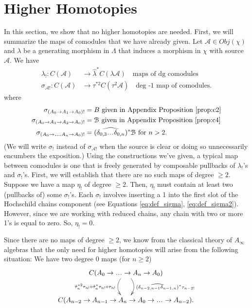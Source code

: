 \section{Higher Homotopies}
In this section, we show 
that no higher homotopies are needed. 
First, we will summarize the 
maps of comodules that we have 
already given. Let 
$\mathcal{A} \in Obj(\chi)$ and 
$\lambda$ be a generating morphism in $\Lambda$ 
that induces a morphism in $\chi$ with 
source $\mathcal{A}$. We have 
\begin{align*}
\lambda_!: C(\mathcal{A})
&\to 
\hat{\lambda}^*C(\lambda\mathcal{A})
  \quad \textrm{maps of dg comodules}\\
\sigma_{\mathcal{A}!}:
  C(\mathcal{A}) 
&\to 
\tau^{*2}C(\tau^2\mathcal{A})
  \quad \textrm{deg -1 map of comodules.}
\end{align*}
where
\begin{align*}
\sigma_{(A_0 \to A_1 \to A_0)!}
&= 
B \textrm{ given in Appendix 
  Proposition \ref{prop:c2}}\\
\sigma_{(A_0 \to A_1 \to A_2 \to A_0)!}
&= 
\mathcal{B} \textrm{ given in Appendix 
  Proposition \ref{prop:c4}}\\
\sigma_{(A_0 \to \smdots A_n \to A_0)!}
&= 
(\widehat{\delta_{0,3}\smdots\delta_{0,n}})^*
  \mathcal{B} \textrm{ for } n>2.\\  
\end{align*}
(We will write $\sigma_!$ instead of 
$\sigma_{\mathcal{A}!}$ when the source 
is clear or doing so unnecessarily 
encumbers the exposition.) 
Using the constructions we've given, 
a typical map between comodules is 
one that is freely generated by composable 
pullbacks of $\lambda_!$'s and $\sigma_!$'s. 
First, we will establish that there are 
no such maps of degree $\geq2$. Suppose 
we have a map $\eta_!$ of degree 
$\geq2$. Then, $\eta_!$ must contain at 
least two (pullbacks of) some $\sigma_!$'s. 
Each $\sigma_!$ involves inserting a 1 
into the first slot of the Hochschild 
chains component (see Equations 
\ref{eq:def_sigma}, \ref{eq:def_sigma2}). 
However, since we are working with 
reduced chains, any chain with two or 
more 1's is equal to zero. So, 
$\eta_! = 0$.

Since there are no maps of degree 
$\geq2$, we know from the classical 
theory of $A_\infty$ algebras that 
the only need for higher homotopies 
will arise from the following 
situation: We have two degree 0 
maps (for $n\geq2$)
$$
\xymatrixcolsep{5pc}
\xymatrix{
C(A_0 \to \smdots \to A_n \to A_0) 
 \ar@/^1pc/[d]^{(\widehat{\delta_{n-2,n-1}\delta_{n-1,n}})^*
   \tau_{n-2!}}
 \ar@/_1pc/[d]_{\hat{\tau}_n^{*2} \tau_{n!}\circ
   \hat{\tau}_n^*\tau_{n!}\circ \tau_{n!}}\\
C(A_{n-2} \to A_{n-1} \to A_n \to 
A_0 \to \smdots \to A_{n-2}).
}
$$

